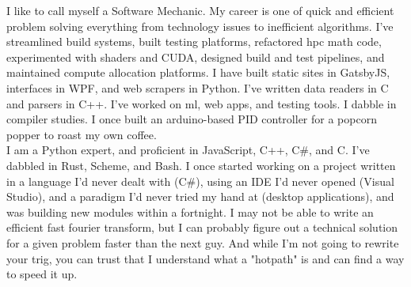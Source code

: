 \documentclass[9pt]{developercv} %
\begin{document}


\large
I like to call myself a Software Mechanic. My career is one of quick and efficient problem
solving everything from technology issues to inefficient algorithms.
I've streamlined build systems, built testing platforms, refactored hpc math code,
experimented with shaders and CUDA, designed build and test pipelines, and maintained compute
allocation platforms. I have built static sites in GatsbyJS, interfaces in WPF, and web scrapers
in Python. I've written data readers in C and parsers in C++. I've worked on ml, web apps, and
testing tools. I dabble in compiler studies. I once built an arduino-based PID controller
for a popcorn popper to roast my own coffee. \\

I am a Python expert, and proficient in JavaScript, C++, C\#, and C. I've dabbled in Rust, Scheme,
and Bash. I once started working on a project written in a language I'd never dealt with (C\#),
using an IDE I'd never opened (Visual Studio), and a paradigm I'd never tried my hand at
(desktop applications), and was building new modules within a fortnight. I may not be able to
write an efficient fast fourier transform, but I can probably figure out a technical solution
for a given problem faster than the next guy. And while I'm not going to rewrite your trig,
you can trust that I understand what a "hotpath" is and can find a way to speed it up. \\


\end{document}
